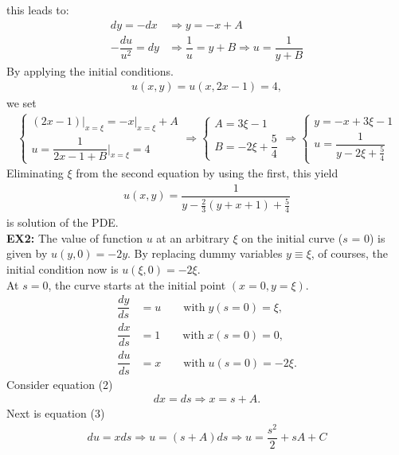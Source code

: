 \documentclass{article}
\newcommand{\f}[2]{\dfrac{#1}{#2}}
\newcommand{\at}[2]{\bigg\rvert_{#1}^{#2} }
\begin{document}
this leads to:
\begin{align*}
	dy = - dx           & \Rightarrow y = -x + A                                    \\
	-\f{du}{u^{2}} = dy & \Rightarrow \f{1}{u} = y + B \Rightarrow u = \f{1}{y + B}
\end{align*}
By applying the initial conditions.
\begin{align*}
	u(x,y) = u(x,2x - 1) = 4,
\end{align*}
we set
\begin{align*}
	\begin{cases}
		(2x - 1)\at{x = \xi}{} = - x \at{x = \xi}{} + A \\
		u = \f{1}{2x - 1 + B} \at{x = \xi}{} = 4
	\end{cases}
	\Rightarrow
	\begin{cases}
		A = 3 \xi - 1 \\
		B = -2\xi + \f{5}{4}
	\end{cases}
	\Rightarrow
	\begin{cases}
		y = - x + 3\xi - 1 \\
		u = \f{1}{y - 2\xi + \frac{5}{4}}
	\end{cases}
\end{align*}
Eliminating $\xi$ from the second equation by using the first, this yield
\begin{align*}
	u(x,y) = \f{1}{y - \frac{2}{3}\left( y + x + 1 \right) + \frac{5}{4}}
\end{align*}
is solution of the PDE.\\
\textbf{EX2:}
The value of function $u$ at an arbitrary $\xi$ on the initial curve ($s$ = 0) is given by $u(y,0) = -2y$. By replacing dummy variables $y \equiv \xi$, of courses, the initial condition now is $u(\xi,0) = -2\xi$.\\
At $s = 0$, the curve starts at the initial point $(x = 0 , y = \xi)$.
\begin{align*}
	\f{dy}{ds} & = u  \quad\quad \text{with} \; y(s = 0) = \xi, \tag{1}   \\
	\f{dx}{ds} & = 1  \quad\quad \text{with} \; x(s = 0) = 0, \tag{2}     \\
	\f{du}{ds} & = x  \quad\quad \text{with} \; u(s = 0) = -2\xi. \tag{3}
\end{align*}
Consider equation (2)
\begin{align*}
	dx = ds \Rightarrow x = s + A .\tag{4}
\end{align*}
Next is equation (3)
\begin{align*}
	du = x ds \Rightarrow u = (s + A) ds \Rightarrow u = \f{s^{2}}{2} + s A + C \tag{5}
\end{align*}
\end{document}

